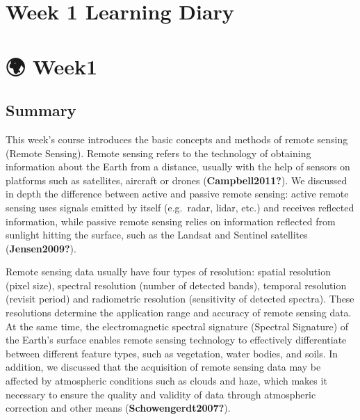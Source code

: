 \documentclass[
  letterpaper,
  DIV=11,
  numbers=noendperiod]{scrreprt}
\begin{document}
\chapter*{Week 1 Learning Diary}\label{week-1-learning-diary}



\chapter*{🌍 Week1}\label{week1}


\section*{Summary}\label{summary}


This week's course introduces the basic concepts and methods of remote
sensing (Remote Sensing). Remote sensing refers to the technology of
obtaining information about the Earth from a distance, usually with the
help of sensors on platforms such as satellites, aircraft or drones
(\textbf{Campbell2011?}). We discussed in depth the difference between
active and passive remote sensing: active remote sensing uses signals
emitted by itself (e.g.~radar, lidar, etc.) and receives reflected
information, while passive remote sensing relies on information
reflected from sunlight hitting the surface, such as the Landsat and
Sentinel satellites (\textbf{Jensen2009?}).

Remote sensing data usually have four types of resolution: spatial
resolution (pixel size), spectral resolution (number of detected bands),
temporal resolution (revisit period) and radiometric resolution
(sensitivity of detected spectra). These resolutions determine the
application range and accuracy of remote sensing data. At the same time,
the electromagnetic spectral signature (Spectral Signature) of the
Earth's surface enables remote sensing technology to effectively
differentiate between different feature types, such as vegetation, water
bodies, and soils. In addition, we discussed that the acquisition of
remote sensing data may be affected by atmospheric conditions such as
clouds and haze, which makes it necessary to ensure the quality and
validity of data through atmospheric correction and other means
(\textbf{Schowengerdt2007?}).
\end{document}
